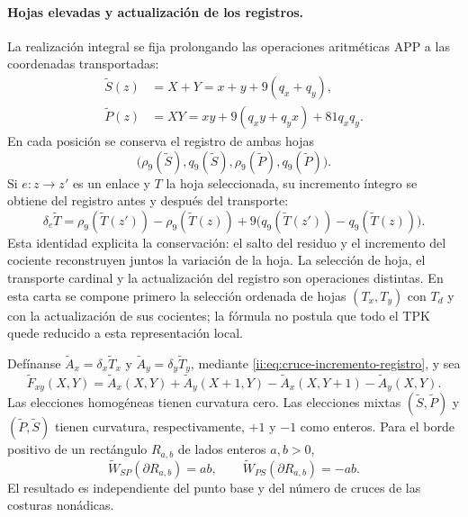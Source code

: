 \paragraph{Hojas elevadas y actualización de los registros.}
La realización integral se fija prolongando las operaciones aritméticas
APP a las coordenadas transportadas:
\begin{align*}
 \widetilde S(z)&=X+Y=x+y+9(q_x+q_y),\\
 \widetilde P(z)&=XY
 =xy+9(q_xy+q_yx)+81q_xq_y.
\end{align*}
En cada posición se conserva el registro de ambas hojas
\[
 \bigl(\rho_9(\widetilde S),q_9(\widetilde S),
       \rho_9(\widetilde P),q_9(\widetilde P)\bigr).
\]
Si $e:z\to z'$ es un enlace y $T$ la hoja seleccionada, su incremento
íntegro se obtiene del registro antes y después del transporte:
\begin{equation}
 \delta_e\widetilde T=
 \rho_9(\widetilde T(z'))-\rho_9(\widetilde T(z))
 +9\bigl(q_9(\widetilde T(z'))-q_9(\widetilde T(z))\bigr).
 \label{ii:eq:cruce-incremento-registro}
\end{equation}
Esta identidad explicita la conservación: el salto del residuo y el
incremento del cociente reconstruyen juntos la variación de la hoja.
La selección de hoja, el transporte cardinal y la actualización del
registro son operaciones distintas. En esta carta se compone primero la
selección ordenada de hojas $(T_x,T_y)$ con $T_d$ y con la actualización
de sus cocientes; la fórmula no postula que todo el TPK quede reducido
a esta representación local.

\begin{proposition}
\label{ii:prop:cruce-stokes-integral}
Defínanse
$\widetilde A_x=\delta_x\widetilde T_x$ y
$\widetilde A_y=\delta_y\widetilde T_y$, mediante
\eqref{ii:eq:cruce-incremento-registro}, y sea
\[
 \widetilde F_{xy}(X,Y)=
 \widetilde A_x(X,Y)+\widetilde A_y(X+1,Y)
 -\widetilde A_x(X,Y+1)-\widetilde A_y(X,Y).
\]
Las elecciones homogéneas tienen curvatura cero. Las elecciones mixtas
$(\widetilde S,\widetilde P)$ y
$(\widetilde P,\widetilde S)$ tienen curvatura, respectivamente,
$+1$ y $-1$ como enteros. Para el borde positivo de un rectángulo
$R_{a,b}$ de lados enteros $a,b>0$,
\[
 \widetilde W_{SP}(\partial R_{a,b})=ab,\qquad
 \widetilde W_{PS}(\partial R_{a,b})=-ab.
\]
El resultado es independiente del punto base y del número de cruces
de las costuras nonádicas.
\end{proposition}

